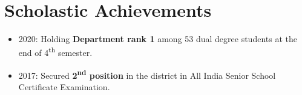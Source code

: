\documentclass[letterpaper,11pt]{article}
\newcommand{\resumeSubHeadingListStart}{\begin{itemize}[leftmargin=*]}
\newcommand{\resumeSubHeadingListEnd}{\end{itemize}}
\begin{document}
\section{Scholastic Achievements}
  \resumeSubHeadingListStart
      \itemsep-0.5em
      \item{2020: Holding \textbf{Department rank 1} among 53 dual degree students at the end of 4\textsuperscript{th} semester.}
      \item{2017: Secured \textbf{2\textsuperscript{nd} position} in the district in All India Senior School Certificate Examination.}
      
  \resumeSubHeadingListEnd
  
\end{document}
